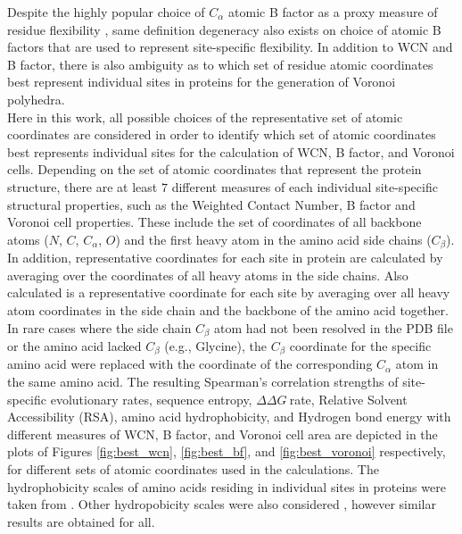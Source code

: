 \documentclass[11pt]{article}
\newcommand{\ddg}{$\Delta\Delta G~$}
\begin{document}
\begin{appendices}
    Despite the highly popular choice of $C_\alpha$ atomic B factor as a proxy measure of residue flexibility \cite{halle_flexibility_2002}, same definition degeneracy also exists on choice of atomic B factors that are used to represent site-specific flexibility. In addition to WCN and B factor, there is also ambiguity as to which set of residue atomic coordinates best represent individual sites in proteins for the generation of Voronoi polyhedra. \\

    Here in this work, all possible choices of the representative set of atomic coordinates are considered in order to identify which set of atomic coordinates best represents individual sites for the calculation of WCN, B factor, and Voronoi cells. Depending on the set of atomic coordinates that represent the protein structure, there are at least $7$ different measures of each individual site-specific structural properties, such as the Weighted Contact Number, B factor and Voronoi cell properties. These include the set of coordinates of all backbone atoms ($N$, $C$, $C_\alpha$, $O$) and the first heavy atom in the amino acid side chains ($C_\beta$). In addition, representative coordinates for each site in protein are calculated by averaging over the coordinates of all heavy atoms in the side chains. Also calculated is a representative coordinate for each site by averaging over all heavy atom coordinates in the side chain and the backbone of the amino acid together. In rare cases where the side chain $C_\beta$ atom had not been resolved in the PDB file or the amino acid lacked $C_\beta$ (e.g., Glycine), the $C_\beta$ coordinate for the specific amino acid were replaced with the coordinate of the corresponding $C_\alpha$ atom in the same amino acid. The resulting Spearman's correlation strengths of site-specific evolutionary rates, sequence entropy, \ddg rate, Relative Solvent Accessibility (RSA), amino acid hydrophobicity, and Hydrogen bond energy with different measures of WCN, B factor, and Voronoi cell area are depicted in the plots of Figures \ref{fig:best_wcn}, \ref{fig:best_bf}, and \ref{fig:best_voronoi} respectively, for different sets of atomic coordinates used in the calculations. The hydrophobicity scales of amino acids residing in individual sites in proteins were taken from \cite{hessa_recognition_2005}. Other hydropobicity scales were also considered \cite{wimley_experimentally_1996, kyte_simple_1982}, however similar results are obtained for all. \\


\end{appendices}
\end{document}
